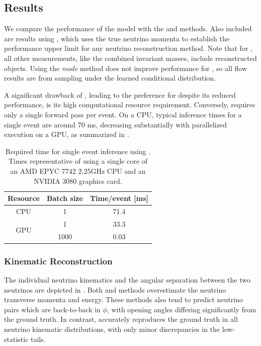 \subsection{Results}

We compare the performance of the \vvflows model with the \vweight and \ellipse methods.
Also included are results using \vtruth, which uses the true neutrino momenta to establish the performance upper limit for any neutrino reconstruction method.
Note that for \vtruth, all other measurements, like the combined invariant masses, include reconstructed objects.
Using the \textit{mode} method does not improve performance for \vvflows, so all flow results are from sampling under the learned conditional distribution.

A significant drawback of \vweight, leading to the preference for \ellipse despite its reduced performance, is its high computational resource requirement. Conversely, \vflows requires only a single forward pass per event. On a CPU, typical inference times for a single event are around 70 ms, decreasing substantially with parallelized execution on a GPU, as summarized in .

\begin{table}[htbp]
    \centering
    \caption{Required time for single event inference using \vvflows. Times representative of using a single core of an AMD EPYC 7742 2.25GHz CPU and an NVIDIA 3080 graphics card.}
    \label{tab:inf_times}
    \begin{tabular}{c c c}
        \toprule
        Resource             & Batch size & Time/event [ms] \\
        \midrule
        CPU                  & 1          & 71.4            \\
        \multirow{2}{*}{GPU} & 1          & 33.3            \\
                             & 1000       & 0.03            \\
        \bottomrule
    \end{tabular}
\end{table}

\subsubsection{Kinematic Reconstruction}

The individual neutrino kinematics and the angular separation between the two neutrinos are depicted in .
Both \vweight and \ellipse methods overestimate the neutrino transverse momenta and energy.
These methods also tend to predict neutrino pairs which are back-to-back in $\phi$, with opening angles differing significantly from the ground truth.
In contrast, \vvflows accurately reproduces the ground truth in all neutrino kinematic distributions, with only minor discrepancies in the low-statistic tails.


